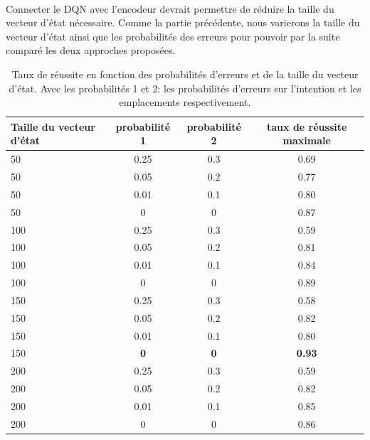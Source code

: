 \paragraph{}Connecter le DQN avec l'encodeur devrait permettre de réduire la taille du vecteur d'état nécessaire. Comme la partie précédente, nous varierons la taille du vecteur d'état ainsi que les probabilités des erreurs pour pouvoir par la suite comparé les deux approches proposées. 
\begin{table}[H]
	\begin{center}
		
		\begin{tabular}{|l|c|c|c|}
			\hline
			\textbf{Taille du vecteur d'état} & \textbf{probabilité 1} & \textbf{probabilité 2} & \textbf{taux de réussite maximale}\\
			\hline
			50 & 0.25 & 0.3 & 0.69\\
			\hline
			50 & 0.05 & 0.2 & 0.77\\
			\hline
			50 & 0.01 & 0.1 & 0.80\\
			\hline
			50 & 0 & 0 & 0.87\\
			\hline
			100 & 0.25 & 0.3 & 0.59\\
			\hline
			100 & 0.05 & 0.2 & 0.81\\
			\hline
			100 & 0.01 & 0.1 & 0.84\\
			\hline
			100 & 0 & 0 & 0.89\\
			\hline
			150 & 0.25 & 0.3 & 0.58\\
			\hline
			150 & 0.05 & 0.2 & 0.82\\
			\hline
			150 & 0.01 & 0.1 & 0.80\\
			\hline
			150 & \textbf{0} & \textbf{0} & \textbf{0.93}\\
			\hline
			200 & 0.25 & 0.3 & 0.59\\
			\hline
			200 & 0.05 & 0.2 & 0.82\\
			\hline
			\rowcolor{LightCyan}
			200 & 0.01 & 0.1 & 0.85\\
			\hline
			200 & 0 & 0 & 0.86\\
			\hline
		\end{tabular}
		\caption{Taux de réussite en fonction des probabilités d'erreurs et de la taille du vecteur d'état. Avec les probabilités 1 et 2: les probabilités d'erreurs sur l'intention et les emplacements respectivement.}\label{table_results_con}
	\end{center}
\end{table}
